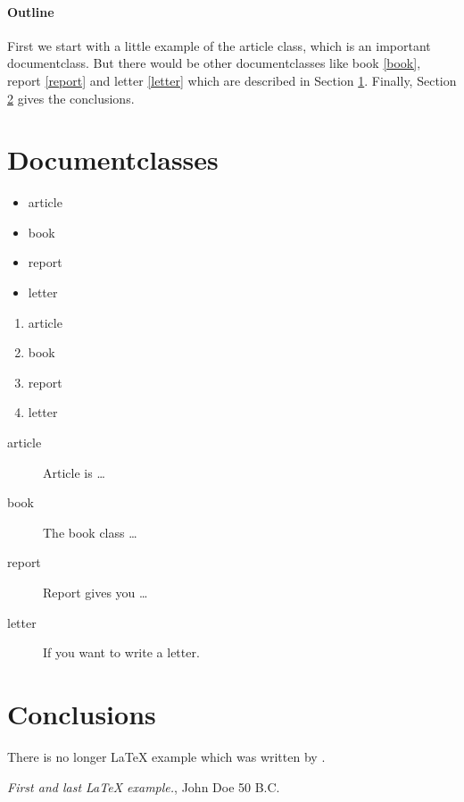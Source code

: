 \documentclass{article}
\begin{document}
\paragraph{Outline}
First we start with a little example of the article class, which is an 
important documentclass. But there would be other documentclasses like 
book \ref{book}, report \ref{report} and letter \ref{letter} which are 
described in Section \ref{documentclasses}. Finally, Section 
\ref{conclusions} gives the conclusions.



\section{Documentclasses} \label{documentclasses}

\begin{itemize}
\item article
\item book 
\item report 
\item letter 
\end{itemize}


\begin{enumerate}
\item article
\item book 
\item report 
\item letter 
\end{enumerate}

\begin{description}
\item[article\label{article}]{Article is \ldots}
\item[book\label{book}]{The book class \ldots}
\item[report\label{report}]{Report gives you \ldots}
\item[letter\label{letter}]{If you want to write a letter.}
\end{description}


\section{Conclusions}\label{conclusions}
There is no longer \LaTeX{} example which was written by \cite{doe}.


\begin{thebibliography}{9}
 \emph{First and last \LaTeX{} example.},
John Doe 50 B.C. 
\end{thebibliography}
\end{document}
